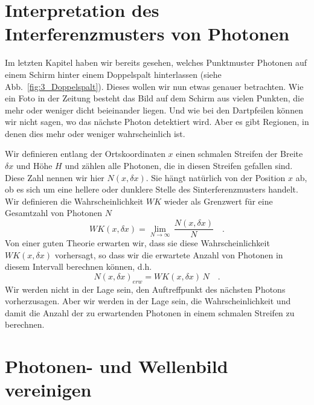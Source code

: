 \section{Interpretation des Interferenzmusters von Photonen }

Im letzten Kapitel haben wir bereits gesehen, welches Punktmuster Photonen auf einem Schirm hinter einem Doppelspalt hinterlassen (siehe Abb.~\ref{fig:3_Doppelspalt}). Dieses wollen wir nun etwas genauer betrachten. Wie ein Foto in der Zeitung besteht das Bild auf dem Schirm aus vielen Punkten, die mehr oder weniger dicht beieinander liegen. Und wie bei den Dartpfeilen können wir nicht sagen, wo das nächste Photon detektiert wird. Aber es gibt Regionen, in denen dies mehr oder weniger wahrscheinlich ist.

Wir definieren entlang der Ortskoordinaten $x$ einen schmalen Streifen der Breite $\delta x$ und Höhe $H$ und zählen alle Photonen, die in diesen Streifen gefallen sind. Diese Zahl nennen wir hier $N(x, \delta x)$. Sie hängt natürlich von der Position $x$ ab, ob es sich um eine hellere oder dunklere Stelle des Sinterferenzmusters handelt. Wir definieren die Wahrscheinlichkeit $WK$ wieder als Grenzwert für eine Gesamtzahl von Photonen $N$
\begin{equation}
    WK(x, \delta x) = \lim_{N \rightarrow \infty} \, \frac{N(x, \delta x)}{N} \quad .
\end{equation}
Von einer guten Theorie erwarten wir, dass sie diese Wahrscheinlichkeit $WK(x, \delta x)$ vorhersagt, so dass wir die erwartete Anzahl von Photonen in diesem Intervall berechnen können, d.h. 
\begin{equation}
    N(x, \delta x)_{ erw} = WK(x, \delta x) \, N \quad .
\end{equation}
Wir werden nicht in der Lage sein, den Auftreffpunkt des nächsten Photons vorherzusagen. Aber wir werden in der Lage sein, die Wahrscheinlichkeit und damit die Anzahl der zu erwartenden Photonen in einem schmalen Streifen zu berechnen.


\section{Photonen- und Wellenbild vereinigen}

